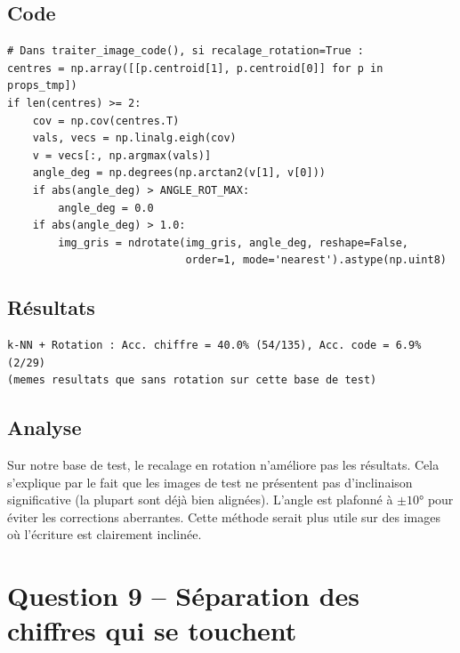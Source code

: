 \documentclass[a4paper,11pt]{article}
\begin{document}
\subsection{Code}

\begin{lstlisting}[style=python, caption={Recalage en rotation par ACP sur les centroïdes.}]
# Dans traiter_image_code(), si recalage_rotation=True :
centres = np.array([[p.centroid[1], p.centroid[0]] for p in props_tmp])
if len(centres) >= 2:
    cov = np.cov(centres.T)
    vals, vecs = np.linalg.eigh(cov)
    v = vecs[:, np.argmax(vals)]
    angle_deg = np.degrees(np.arctan2(v[1], v[0]))
    if abs(angle_deg) > ANGLE_ROT_MAX:
        angle_deg = 0.0
    if abs(angle_deg) > 1.0:
        img_gris = ndrotate(img_gris, angle_deg, reshape=False,
                            order=1, mode='nearest').astype(np.uint8)
\end{lstlisting}

\subsection{Résultats}

\begin{lstlisting}[style=output, caption={Résultats avec recalage en rotation.}]
k-NN + Rotation : Acc. chiffre = 40.0% (54/135), Acc. code = 6.9% (2/29)
(memes resultats que sans rotation sur cette base de test)
\end{lstlisting}

\subsection{Analyse}

Sur notre base de test, le recalage en rotation n'améliore pas les résultats. Cela s'explique par le fait que les images de test ne présentent pas d'inclinaison significative (la plupart sont déjà bien alignées). L'angle est plafonné à $\pm10°$ pour éviter les corrections aberrantes. Cette méthode serait plus utile sur des images où l'écriture est clairement inclinée.


\section{Question 9 -- Séparation des chiffres qui se touchent}
\end{document}

